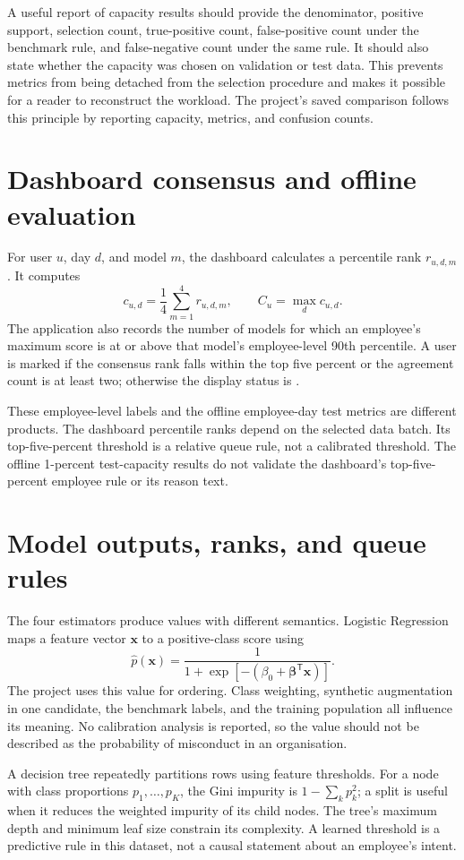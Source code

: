 A useful report of capacity results should provide the denominator,
positive support, selection count, true-positive count, false-positive
count under the benchmark rule, and false-negative count under the same
rule. It should also state whether the capacity was chosen on
validation or test data. This prevents metrics from being detached
from the selection procedure and makes it possible for a reader to
reconstruct the workload. The project's saved comparison follows this
principle by reporting capacity, metrics, and confusion counts.

\section{Dashboard consensus and offline evaluation}
For user \(u\), day \(d\), and model \(m\), the dashboard calculates a
percentile rank \(r_{u,d,m}\). It computes
\[
c_{u,d}=\frac{1}{4}\sum_{m=1}^{4}r_{u,d,m},
\qquad C_u=\max_d c_{u,d}.
\]
The application also records the number of models for which an
employee's maximum score is at or above that model's employee-level
90th percentile. A user is marked  if the consensus
rank falls within the top five percent or the agreement count is at
least two; otherwise the display status is .

These employee-level labels and the offline employee-day test metrics
are different products. The dashboard percentile ranks depend on the
selected data batch. Its top-five-percent threshold is a relative
queue rule, not a calibrated threshold. The offline 1-percent
test-capacity results do not validate the dashboard's top-five-percent
employee rule or its reason text.

\section{Model outputs, ranks, and queue rules}
The four estimators produce values with different semantics. Logistic
Regression maps a feature vector \(\mathbf{x}\) to a positive-class
score using
\[
 \hat p(\mathbf{x})=\frac{1}{1+\exp[-(\beta_0+
                    \boldsymbol{\beta}^{\mathsf T}\mathbf{x})]}.
\]
The project uses this value for ordering. Class weighting, synthetic
augmentation in one candidate, the benchmark labels, and the training
population all influence its meaning. No calibration analysis is
reported, so the value should not be described as the probability of
misconduct in an organisation.

A decision tree repeatedly partitions rows using feature thresholds.
For a node with class proportions \(p_1,\ldots,p_K\), the Gini
impurity is \(1-\sum_k p_k^2\); a split is useful when it reduces the
weighted impurity of its child nodes. The tree's maximum depth and
minimum leaf size constrain its complexity. A learned threshold is a
predictive rule in this dataset, not a causal statement about an
employee's intent.

